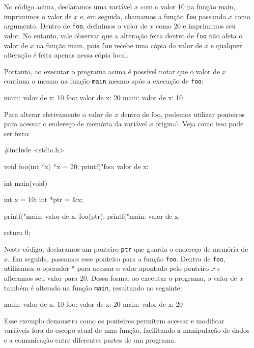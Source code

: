 No código acima, declaramos uma variável \(x\) com o valor 10 na função main, 
imprimimos o valor de \(x\) e, em seguida, chamamos a função \texttt{foo} 
passando \(x\) como argumento. Dentro de \texttt{foo}, definimos o valor de 
\(x\) como 20 e imprimimos seu valor. No entanto, vale observar que a alteração 
feita dentro de \texttt{foo} não afeta o valor de \(x\) na função main, pois 
\texttt{foo} recebe uma cópia do valor de \(x\) e qualquer alteração é feita 
apenas nessa cópia local.

Portanto, ao executar o programa acima é possível notar que o valor de \(x\) 
continua o mesmo na função \texttt{main} mesmo após a execução de \texttt{foo}:

\begin{textbox}
    main: valor de x: 10
    foo: valor de x: 20
    main: valor de x: 10
\end{textbox}

Para alterar efetivamente o valor de \(x\) dentro de foo, podemos utilizar 
ponteiros para acessar o endereço de memória da variável \(x\) original. Veja 
como isso pode ser feito:

\begin{excode}
    #include <stdio.h>

    void foo(int *x)
    {
        *x = 20;
        printf("foo: valor de x: %
    }

    int main(void)
    {
        int x = 10;
        int *ptr = &x;

        printf("main: valor de x: %
        foo(ptr);
        printf("main: valor de x: %

        return 0;
    }
\end{excode}

Neste código, declaramos um ponteiro \texttt{ptr} que guarda o endereço de 
memória de \(x\). Em seguida, passamos esse ponteiro para a função 
\texttt{foo}. Dentro de \texttt{foo}, utilizamos o operador * para acessar o 
valor apontado pelo ponteiro \(x\) e alteramos seu valor para 20. Dessa forma, 
ao executar o programa, o valor de \(x\) também é alterado na função 
\texttt{main}, resultando no seguinte:

\begin{textbox}
    main: valor de x: 10
    foo: valor de x: 20
    main: valor de x: 20
\end{textbox}

Esse exemplo demonstra como os ponteiros permitem acessar e modificar variáveis 
fora do escopo atual de uma função, facilitando a manipulação de dados e a 
comunicação entre diferentes partes de um programa.

